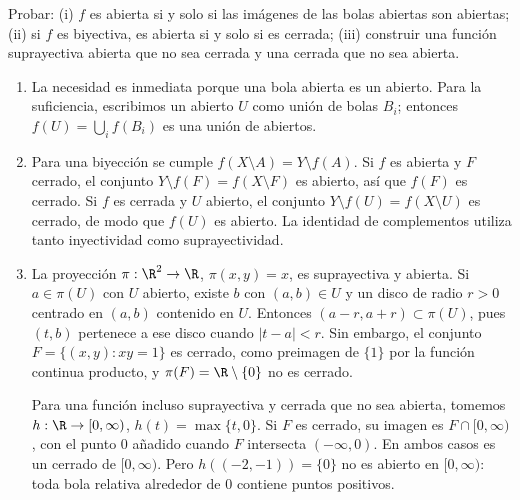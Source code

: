 \begin{ejercicio}
Probar: (i) $f$ es abierta si y solo si las imágenes de las bolas abiertas son abiertas; (ii) si $f$ es biyectiva, es abierta si y solo si es cerrada; (iii) construir una función suprayectiva abierta que no sea cerrada y una cerrada que no sea abierta.
\end{ejercicio}
\begin{solucion}
\begin{enumerate}[label=(\roman*)]
\item La necesidad es inmediata porque una bola abierta es un abierto. Para la suficiencia, escribimos un abierto $U$ como unión de bolas $B_i$; entonces $f(U)=\bigcup_if(B_i)$ es una unión de abiertos.
\item Para una biyección se cumple $f(X\setminus A)=Y\setminus f(A)$. Si $f$ es abierta y $F$ cerrado, el conjunto $Y\setminus f(F)=f(X\setminus F)$ es abierto, así que $f(F)$ es cerrado. Si $f$ es cerrada y $U$ abierto, el conjunto $Y\setminus f(U)=f(X\setminus U)$ es cerrado, de modo que $f(U)$ es abierto. La identidad de complementos utiliza tanto inyectividad como suprayectividad.
\item La proyección $\pi:\R^2\to\R$, $\pi(x,y)=x$, es suprayectiva y abierta. Si $a\in\pi(U)$ con $U$ abierto, existe $b$ con $(a,b)\in U$ y un disco de radio $r>0$ centrado en $(a,b)$ contenido en $U$. Entonces $(a-r,a+r)\subset\pi(U)$, pues $(t,b)$ pertenece a ese disco cuando $|t-a|<r$. Sin embargo, el conjunto $F=\{(x,y):xy=1\}$ es cerrado, como preimagen de $\{1\}$ por la función continua producto, y $\pi(F)=\R\setminus\{0\}$ no es cerrado.

Para una función incluso suprayectiva y cerrada que no sea abierta, tomemos $h:\R\to[0,\infty)$, $h(t)=\max\{t,0\}$. Si $F$ es cerrado, su imagen es $F\cap[0,\infty)$, con el punto $0$ añadido cuando $F$ intersecta $(-\infty,0)$. En ambos casos es un cerrado de $[0,\infty)$. Pero $h((-2,-1))=\{0\}$ no es abierto en $[0,\infty)$: toda bola relativa alrededor de $0$ contiene puntos positivos.
\end{enumerate}
\end{solucion}


